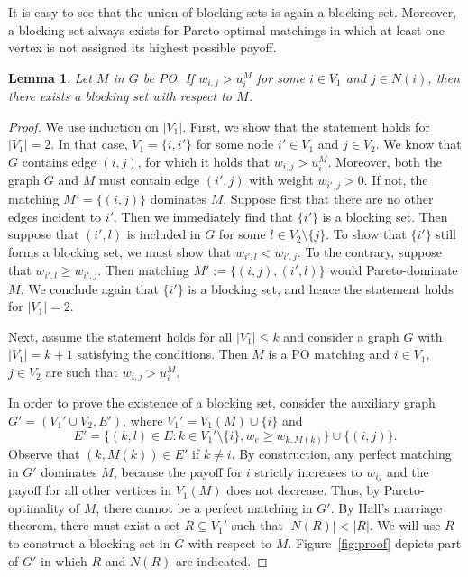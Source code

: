\documentclass[a4paper, 11pt]{article}
\newtheorem{lem}[thm]{Lemma}
\begin{document}
It is easy to see that the union of blocking sets is again a blocking set. Moreover, a blocking set always exists for Pareto-optimal matchings in which at least one vertex is not assigned its highest possible payoff.
\begin{lem}
Let $M$ in $G$ be PO. If $w_{i,j} > u_i^M$ for some $i \in V_1$ and $j \in N(i)$, then there exists a blocking set with respect to $M$. \label{lem:blocking}
\end{lem}
\begin{proof}
We use induction on $|V_1|$. First, we show that the statement holds for $|V_1| = 2$. In that case, $V_1 = \{i, i'\}$ for some node $i'\in V_1$ and $j\in V_2$. We know that $G$ contains edge $(i, j)$, for which it holds that $w_{i,j} > u_i^M$. Moreover, both the graph $G$ and $M$ must contain edge $(i', j)$ with weight $w_{i', j} > 0$. If not, the matching $M'=\{(i,j)\}$ dominates $M$. Suppose first that there are no other edges incident to $i'$. Then we immediately find that $\{ i' \}$ is a blocking set. Then suppose that $(i', l)$ is included in $G$ for some $l\in V_2\setminus\{j\}$. To show that $\{ i' \}$ still forms a blocking set, we must show that $w_{i', l} < w_{i', j}$. To the contrary, suppose that $w_{i', l} \geq w_{i', j}$. Then matching $M' := \{ (i, j), (i', l) \}$ would Pareto-dominate $M$. We conclude again that $\{ i' \}$ is a blocking set, and hence the statement holds for $|V_1| = 2$. 

Next, assume the statement holds for all $|V_1| \leq k$ and consider a graph $G$ with $|V_1| = k + 1$ satisfying the conditions. Then $M$ is a PO matching and $i\in V_1$, $j\in V_2$ are such that $w_{i,j} > u_i^M$. 

In order to prove the existence of a blocking set, consider the auxiliary graph $G'=(V_1' \cup V_2, E')$, where $V_1'=V_1(M)\cup\{i\}$ and 
$$E'=\{(k,l)\in E: k\in V_1'\setminus\{i\}, w_e \geq w_{k,M(k)}\}\cup\{(i,j)\}.$$
Observe that $(k,M(k))\in E'$ if $k\neq i$. By construction, any perfect matching in $G'$ dominates $M$, because the payoff for $i$ strictly increases to $w_{ij}$ and the payoff for all other vertices in $V_1(M)$ does not decrease. Thus, by Pareto-optimality of $M$, there cannot be a perfect matching in $G'$. By Hall's marriage theorem, there must exist a set $R\subseteq V_1'$ such that $|N(R)|<|R|$. We will use $R$ to construct a blocking set in $G$ with respect to $M$. Figure~\ref{fig:proof} depicts part of $G'$ in which $R$ and $N(R)$ are indicated.


\end{proof}
\end{document}
